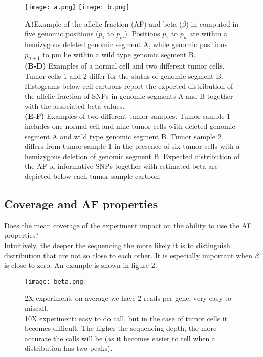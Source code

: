 \begin{figure}[htbp!]
	\centering
	\texttt{[image: a.png]}
	\texttt{[image: b.png]}
	\caption{
	\textbf{A)}Example of the allelic fraction (AF) and beta ($\beta$) in computed in five genomic positions ($p_1$ to $p_m$). Positions $p_1$ to $p_n$ are within a hemizygous deleted genomic segment A, while genomic positions $p_{n+1}$ to pm lie within a wild type genomic segment B.\\
\textbf{(B-D)} Examples of a normal cell and two different tumor cells. Tumor cells 1 and 2 differ for the status of genomic segment B. Histograms below cell cartoons report the expected distribution of the allelic fraction of SNPs in genomic segments A and B together with the associated beta values.\\
\textbf{(E-F)} Examples of two different tumor samples. Tumor sample 1 includes one normal cell and nine tumor cells with deleted genomic segment A and wild type genomic segment B. Tumor sample 2 differs from tumor sample 1 in the presence of six tumor cells with a hemizygous deletion of genomic segment B.
Expected distribution of the AF of informative SNPs together with estimated beta are depicted below each tumor sample cartoon.}
\label{fig:a_b}
\end{figure}

\subsection{Coverage and AF properties}
Does the mean coverage of the experiment impact on the ability to use the AF properties?\\
Intuitively, the deeper the sequencing the more likely it is to distinguish distribution that are not so close to each other. It is especially important when $\beta$ is close to zero. An example is shown in figure \ref{fig:beta}.


\begin{figure}[H]
	\centering
	\texttt{[image: beta.png]}
	\caption{2X experiment: on average we have 2 reads per gene, very easy to miscall.\\
10X experiment: easy to do call, but in the case of tumor cells it becomes difficult. The higher the sequencing depth, the more accurate the calls will be (as it becomes easier to tell when a distribution has two peaks).
}
\label{fig:beta}
\end{figure}

